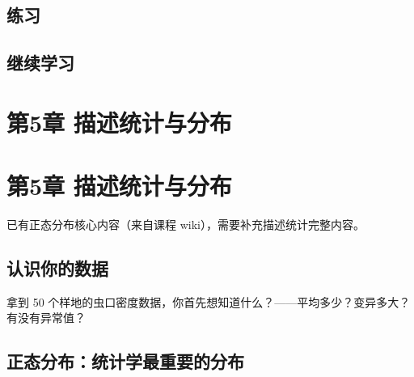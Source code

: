 \documentclass[
  letterpaper,
]{scrbook}
\begin{document}
\section{练习}\label{ux7ec3ux4e60-3}

\section{继续学习}\label{ux7ee7ux7eedux5b66ux4e60-1}

\chapter{第5章
描述统计与分布}\label{ux7b2c5ux7ae0-ux63cfux8ff0ux7edfux8ba1ux4e0eux5206ux5e03}

\chapter{第5章
描述统计与分布}\label{ux7b2c5ux7ae0-ux63cfux8ff0ux7edfux8ba1ux4e0eux5206ux5e03-1}

\begin{tcolorbox}[enhanced jigsaw, arc=.35mm, bottomrule=.15mm, bottomtitle=1mm, breakable, colback=white, colbacktitle=quarto-callout-note-color!10!white, colframe=quarto-callout-note-color-frame, coltitle=black, left=2mm, leftrule=.75mm, opacityback=0, opacitybacktitle=0.6, rightrule=.15mm, title=\textcolor{quarto-callout-note-color}{\faInfo}\hspace{0.5em}{本章状态：sprout}, titlerule=0mm, toprule=.15mm, toptitle=1mm]

已有正态分布核心内容（来自课程 wiki），需要补充描述统计完整内容。

\end{tcolorbox}

\section{认识你的数据}\label{ux8ba4ux8bc6ux4f60ux7684ux6570ux636e}

拿到 50
个样地的虫口密度数据，你首先想知道什么？------平均多少？变异多大？有没有异常值？

\section{正态分布：统计学最重要的分布}\label{ux6b63ux6001ux5206ux5e03ux7edfux8ba1ux5b66ux6700ux91cdux8981ux7684ux5206ux5e03}
\end{document}
